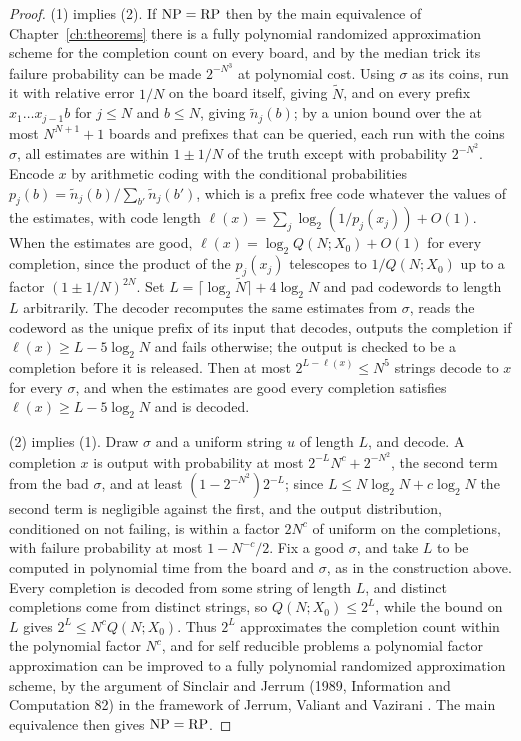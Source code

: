 \begin{proof}
(1) implies (2). If $\mathrm{NP} = \mathrm{RP}$ then by the main equivalence of Chapter~\ref{ch:theorems} there is a fully polynomial randomized approximation scheme for the completion count on every board, and by the median trick its failure probability can be made $2^{-N^3}$ at polynomial cost. Using $\sigma$ as its coins, run it with relative error $1/N$ on the board itself, giving $\tilde N$, and on every prefix $x_1 \dots x_{j-1} b$ for $j \le N$ and $b \le N$, giving $\tilde n_j(b)$; by a union bound over the at most $N^{N+1} + 1$ boards and prefixes that can be queried, each run with the coins $\sigma$, all estimates are within $1 \pm 1/N$ of the truth except with probability $2^{-N^2}$. Encode $x$ by arithmetic coding with the conditional probabilities $p_j(b) = \tilde n_j(b) / \sum_{b'} \tilde n_j(b')$, which is a prefix free code whatever the values of the estimates, with code length $\ell(x) = \sum_j \log_2 (1 / p_j(x_j)) + O(1)$. When the estimates are good, $\ell(x) = \log_2 Q(N; X_0) + O(1)$ for every completion, since the product of the $p_j(x_j)$ telescopes to $1 / Q(N; X_0)$ up to a factor $(1 \pm 1/N)^{2N}$. Set $L = \lceil \log_2 \tilde N \rceil + 4 \log_2 N$ and pad codewords to length $L$ arbitrarily. The decoder recomputes the same estimates from $\sigma$, reads the codeword as the unique prefix of its input that decodes, outputs the completion if $\ell(x) \ge L - 5 \log_2 N$ and fails otherwise; the output is checked to be a completion before it is released. Then at most $2^{L - \ell(x)} \le N^5$ strings decode to $x$ for every $\sigma$, and when the estimates are good every completion satisfies $\ell(x) \ge L - 5 \log_2 N$ and is decoded.

(2) implies (1). Draw $\sigma$ and a uniform string $u$ of length $L$, and decode. A completion $x$ is output with probability at most $2^{-L} N^c + 2^{-N^2}$, the second term from the bad $\sigma$, and at least $(1 - 2^{-N^2}) 2^{-L}$; since $L \le N \log_2 N + c \log_2 N$ the second term is negligible against the first, and the output distribution, conditioned on not failing, is within a factor $2 N^c$ of uniform on the completions, with failure probability at most $1 - N^{-c} / 2$. Fix a good $\sigma$, and take $L$ to be computed in polynomial time from the board and $\sigma$, as in the construction above. Every completion is decoded from some string of length $L$, and distinct completions come from distinct strings, so $Q(N; X_0) \le 2^L$, while the bound on $L$ gives $2^L \le N^c Q(N; X_0)$. Thus $2^L$ approximates the completion count within the polynomial factor $N^c$, and for self reducible problems a polynomial factor approximation can be improved to a fully polynomial randomized approximation scheme, by the argument of Sinclair and Jerrum (1989, Information and Computation 82) \cite{SinclairJerrum} in the framework of Jerrum, Valiant and Vazirani \cite{JVV}. The main equivalence then gives $\mathrm{NP} = \mathrm{RP}$.
\end{proof}

